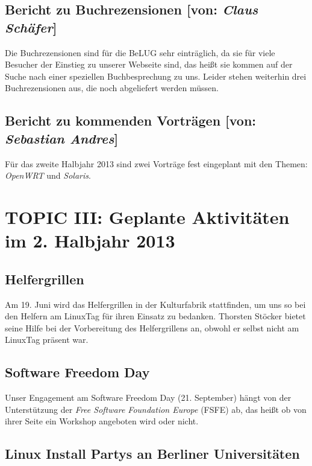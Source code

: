 \documentclass[11pt,a4paper,ngerman]{article}
\begin{document}
  \subsection{Bericht zu Buchrezensionen [von: 
\textcolor{hellgrau.60}{\textsl{Claus Schäfer}}]}

Die Buchrezensionen sind für die BeLUG sehr einträglich, da sie für viele 
Besucher der Einstieg zu unserer Webseite sind, das heißt sie kommen auf der 
Suche nach einer speziellen Buchbesprechung zu uns. Leider stehen weiterhin 
drei Buchrezensionen aus, die noch abgeliefert werden müssen.


  \subsection{Bericht zu kommenden Vorträgen [von: 
\textcolor{hellgrau.60}{\textsl{Sebastian Andres}}]}

Für das zweite Halbjahr 2013 sind zwei Vorträge fest eingeplant mit den Themen: 
\textsl{OpenWRT} und \textsl{Solaris}.


\section{TOPIC III: Geplante Aktivitäten im 2. Halbjahr 2013}


  \subsection{Helfergrillen}
  
Am 19. Juni wird das Helfergrillen in der Kulturfabrik stattfinden, um uns so 
bei den Helfern am LinuxTag für ihren Einsatz zu bedanken. Thorsten Stöcker 
bietet seine Hilfe bei der Vorbereitung des Helfergrillens an, obwohl er 
selbst nicht am LinuxTag präsent war.



  \subsection{Software Freedom Day}
  
Unser Engagement am Software Freedom Day (21. September) hängt von der 
Unterstützung der \emph{Free Software Foundation Europe} (FSFE) ab, das heißt 
ob von ihrer Seite ein Workshop angeboten wird oder nicht.


  \subsection{Linux Install Partys an Berliner Universitäten}
\end{document}
